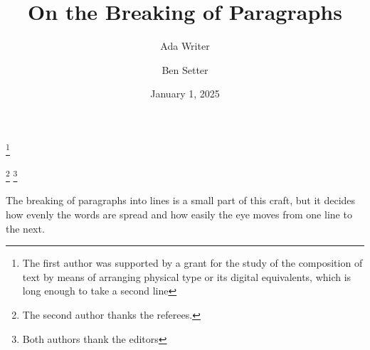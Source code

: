 \documentclass{amsart}
\begin{document}
\title{On the Breaking of Paragraphs}
\author{Ada Writer}
\thanks{The first author was supported by a grant for the study of the composition of text by means of arranging physical type or its digital equivalents, which is long enough to take a second line}
\author{Ben Setter}
\thanks{The second author thanks the referees.}
\thanks{Both authors thank the editors}
\date{January 1, 2025}
\maketitle
The breaking of paragraphs into lines is a small part of this craft, but it decides how evenly the words are spread and how easily the eye moves from one line to the next.
\end{document}
